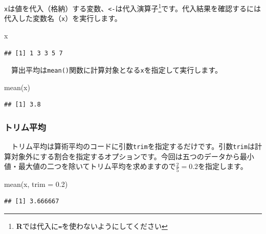 \documentclass[
  12pt,
]{book}
\newenvironment{Shaded}{\begin{snugshade}}{\end{snugshade}}
\newcommand{\AttributeTok}[1]{\textcolor[rgb]{0.77,0.63,0.00}{#1}}
\newcommand{\FloatTok}[1]{\textcolor[rgb]{0.00,0.00,0.81}{#1}}
\newcommand{\FunctionTok}[1]{\textcolor[rgb]{0.00,0.00,0.00}{#1}}
\newcommand{\NormalTok}[1]{#1}
\begin{document}
\texttt{x}は値を代入（格納）する変数、\texttt{\textless{}-}は代入演算子\footnote{\textbf{R}では代入に\texttt{=}を使わないようにしてください}です。代入結果を確認するには代入した変数名（\texttt{x}）を実行します。

\begin{Shaded}
\begin{Highlighting}[numbers=left,,]
\NormalTok{x}
\end{Highlighting}
\end{Shaded}

\begin{verbatim}
## [1] 1 3 3 5 7
\end{verbatim}

　算出平均は\texttt{mean()}関数に計算対象となる\texttt{x}を指定して実行します。

\begin{Shaded}
\begin{Highlighting}[numbers=left,,]
\FunctionTok{mean}\NormalTok{(x)}
\end{Highlighting}
\end{Shaded}

\begin{verbatim}
## [1] 3.8
\end{verbatim}

\hypertarget{ux30c8ux30eaux30e0ux5e73ux5747}{%
\subsubsection*{\texorpdfstring{トリム平均}{トリム平均}}\label{ux30c8ux30eaux30e0ux5e73ux5747}}

　トリム平均は算術平均のコードに引数\texttt{trim}を指定するだけです。引数\texttt{trim}は計算対象外にする割合を指定するオプションです。今回は五つのデータから最小値・最大値の二つを除いてトリム平均を求めますので\(\frac{2}{5} = 0.2\)を指定します。

\begin{Shaded}
\begin{Highlighting}[numbers=left,,]
\FunctionTok{mean}\NormalTok{(x, }\AttributeTok{trim =} \FloatTok{0.2}\NormalTok{)}
\end{Highlighting}
\end{Shaded}

\begin{verbatim}
## [1] 3.666667
\end{verbatim}
\end{document}
